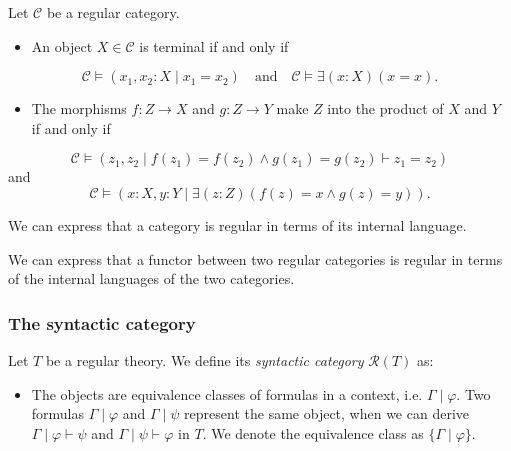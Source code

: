 \documentclass[14pt]{beamer}
\theoremstyle{plain}
\begin{document}
  \begin{frame}
    \begin{lemma}
      Let $\mathcal{C}$ be a regular category.
      \begin{itemize}
        \item An object $X \in \mathcal{C}$ is terminal if and only if
      \end{itemize}
      \[ \mathcal{C} \models (x_1,x_2:X \mid x_1 = x_2) \quad \text{and} \quad
      {\mathcal{C} \models \exists (x:X) (x=x)}.\]
      \pause
      \begin{itemize}
        \item The morphisms $f : Z \to X$ and $g : Z \to Y$ make $Z$ into
        the product of  $X$ and $Y$ if and only if
      \end{itemize}
      \[\mathcal{C} \models (z_1,z_2 \mid f(z_1) = f(z_2) \wedge
        g(z_1) = g(z_2) \vdash z_1 = z_2)\] and
      \[\mathcal{C} \models (x:X,y:Y \mid \exists (z:Z)(f(z) = x \wedge
        g(z) = y)).\]
    \end{lemma}
  \end{frame}

  \begin{frame}
    \begin{corollary}
      We can express that a category is regular in terms of its internal language.
    \end{corollary}
    \pause
    \begin{corollary}
      We can express that a functor between two regular categories is regular in
      terms of the internal languages of the two categories.
    \end{corollary}
  \end{frame}

  \begin{frame}
    \frametitle{The syntactic category}
    Let $T$ be a regular theory. We define its \emph{syntactic category} $\mathcal{R}(T)$
    as:
    \pause
    \begin{itemize}
      \item The objects are equivalence classes of formulas in a context, i.e.
        $\Gamma \mid \varphi$. \pause Two formulas $\Gamma \mid \varphi$ and $\Gamma \mid \psi$
        represent the same object, when we can derive $\Gamma \mid \varphi \vdash \psi$
        and $\Gamma \mid \psi \vdash \varphi$ in $T$. \pause We denote the equivalence
        class as $\{ \Gamma \mid \varphi \}$.
    \end{itemize}
  \end{frame}
\end{document}
